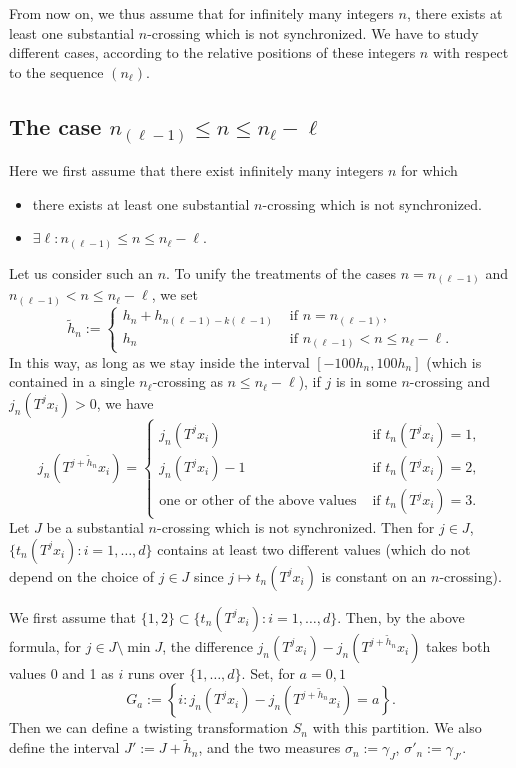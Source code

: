 \documentclass[10pt]{amsart}
\theoremstyle{definition}\newtheorem{defi}[theo]{Definition}\newtheorem{rema}[theo]{Remark}\newtheorem{exam}[theo]{Example}\newtheorem{exem}[theo]{Example}\newtheorem{nota}[theo]{Notation}
\newcommand{\egdef}{:=}
\let\oldexists\exists
\renewcommand*{\exists}{\mathrel{\oldexists}}
\begin{document}
From now on, we thus assume that for infinitely many integers $n$, there exists at least one substantial $n$-crossing which is not synchronized. We have to study different cases, according to the relative positions of these integers $n$ with respect to the sequence $(n_\ell)$.



\subsection{The case \texorpdfstring{$n_{(\ell-1)} \le n \le n_{\ell}-\ell$}{n(l-1) le n le nl-l}}\label{sec:easycase}
Here we first assume that there exist infinitely many integers $n$ for which
\begin{itemize}
\item there exists at least one substantial $n$-crossing which is not synchronized.
\item $\exists\ell: n_{(\ell-1)} \le n \le n_{\ell}-\ell$.
\end{itemize}

Let us consider such an $n$. To unify the treatments of the cases $n=n_{(\ell-1)}$ and $n_{(\ell-1)} < n \le n_{\ell}-\ell$, we set
\[
\tilde h_n \egdef
\begin{cases}
h_{n}+h_{n(\ell-1)-k(\ell-1)} &\text{ if }n=n_{(\ell-1)},\\
h_n &\text{ if }n_{(\ell-1)} < n \le n_{\ell}-\ell.
\end{cases}
\]
In this way, as long as we stay inside the interval $[-100 h_n, 100h_n]$ (which is contained in a single $n_\ell$-crossing as $n \le n_{\ell}-\ell$), if $j$ is in some $n$-crossing and $j_n(T^jx_i)>0$, we have
\[
j_n\left(T^{j+\tilde h_n }x_i\right) =
\begin{cases}
j_n\left(T^{j}x_i\right) &\text{ if }t_n(T^jx_{i})=1,\\
j_n\left(T^{j}x_i\right) -1 &\text{ if }t_n(T^jx_{i})=2,\\
\text{one or other of the above values} &\text{ if }t_n(T^jx_{i})=3.
\end{cases}
\]
Let $J$ be a substantial $n$-crossing which is not synchronized. Then for $j\in J$, $\{t_n(T^j x_i):i=1,\ldots,d\}$ contains at least two different values (which do not depend on the choice of $j\in J$ since $j\mapsto t_n(T^jx_i)$ is constant on an $n$-crossing).

We first assume that $\{1,2\}\subset \{t_n(T^j x_i):i=1,\ldots,d\}$. Then, by the above formula, for $j\in J\setminus \min J$, the difference $j_n\left(T^{j}x_i\right) - j_n\left(T^{j+\tilde h_n }x_i\right)$ takes both values 0 and 1 as $i$ runs over $\{1,\ldots,d\}$. Set, for $a=0,1$
\[
G_a\egdef \left\{i: j_n\left(T^{j}x_i\right) - j_n\left(T^{j+\tilde h_n }x_i\right) = a\right\}.
\]
Then we can define a twisting transformation $S_n$ with this partition. We also define the interval $J'\egdef J+\tilde h_n $, and the two measures $\sigma_n\egdef \gamma_{J}$, $\sigma'_n\egdef \gamma_{J'}$.
\end{document}
